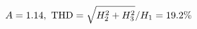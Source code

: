 \documentclass[preview]{standalone}
\begin{document}
\begin{align*}
\special{dvisvgm:raw <g id='unique000'>}A=1.14,\ \text{THD}=\sqrt{H_2^2+H_3^2}/H_1=19.2\%\special{dvisvgm:raw </g>}
\end{align*}
\end{document}
